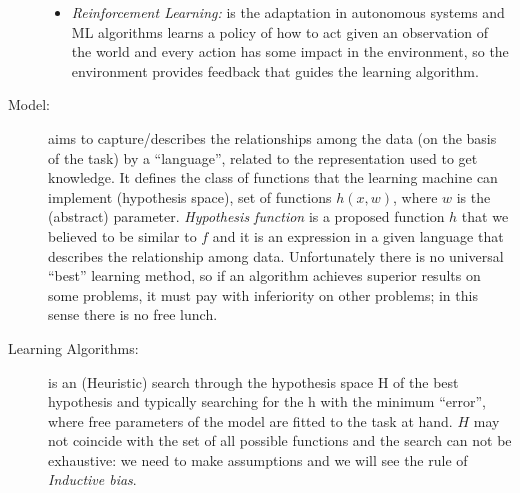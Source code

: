 \begin{description}
\begin{itemize}
                        \item \emph{Reinforcement Learning: } is the adaptation in autonomous systems and 
                              ML algorithms learns a policy of how to act given an observation of the
                              world and every action has some impact in the environment, so the
                              environment provides feedback that guides the learning algorithm.
                   \end{itemize}
    \item [Model: ] aims to capture/describes the relationships among the data (on the basis of the task)
                    by a “language”, related to the representation used to get knowledge.\newline
                    It defines the class of functions that the learning machine can implement (hypothesis space),
                    set of functions $h(x, w)$, where $w$ is the (abstract) parameter.\newline
                    \emph{Hypothesis function} is a proposed function $h$ that we believed to be similar to $f$ 
                    and it is an expression in a given language that describes the relationship among data.\newline
                    Unfortunately there is no universal “best” learning method, so if an algorithm achieves
                    superior results on some problems, it must pay with inferiority on other problems;
                    in this sense there is no free lunch.

    \item [Learning Algorithms: ] is an (Heuristic) search through the hypothesis space H of the best hypothesis
                                  and typically searching for the h with the minimum “error”, where 
                                  free parameters of the model are fitted to the task at hand.\newline
                                  $H$ may not coincide with the set of all possible functions and the
                                  search can not be exhaustive: we need to make assumptions and we will
                                  see the rule of \emph{Inductive bias}.
    

\end{description}
